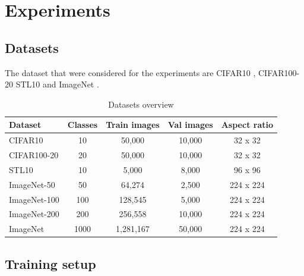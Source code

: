 \newpage



\section{Experiments}
\label{sec:verify}


\subsection{Datasets}

The dataset that were considered for the experiments are  CIFAR10 \cite{CIFAR}, CIFAR100- 20 \cite{CIFAR} STL10 \cite{yao2016automatic} and ImageNet \cite{ImageNet}.

%
%


\setlength{\tabcolsep}{4pt}
\begin{table}[ht!]
\scriptsize
\begin{center}
\caption{Datasets overview}
\label{tab: datasets}
\begin{tabular}{@{}l cccc @{}}
\toprule
\textbf{Dataset} & \textbf{Classes} & \textbf{Train images} & \textbf{Val images} & \textbf{Aspect ratio}\\ 
\midrule
CIFAR10 & 10 & 50,000 & 10,000 & 32 x 32\\
CIFAR100-20 & 20 & 50,000 & 10,000 & 32 x 32\\
STL10 & 10 & 5,000 & 8,000 & 96 x 96\\
ImageNet-50 & 50 & 64,274 & 2,500 & 224 x 224\\
ImageNet-100 & 100 & 128,545 & 5,000 & 224 x 224\\
ImageNet-200 & 200 & 256,558 & 10,000 & 224 x 224\\
ImageNet & 1000 & 1,281,167 & 50,000 & 224 x 224\\
\bottomrule
\end{tabular}
\end{center}
\end{table}


\subsection{Training setup}

